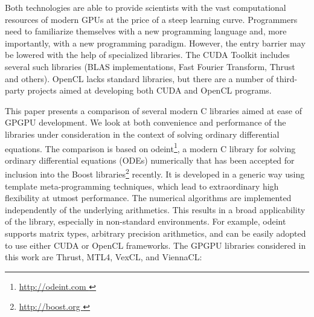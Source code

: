 \documentclass[final]{siamltex}
\newcommand{\addpp}[1]{{#1\nolinebreak[4]\hspace{-.05em}\raisebox{.4ex}{\tiny\bf ++}}\xspace}
\newcommand{\Cpp}{\addpp{C}}
\begin{document}
Both technologies are able to provide scientists with the vast computational
resources of modern GPUs at the price of a steep learning curve.  Programmers
need to familiarize themselves with a new programming language and, more
importantly, with a new programming paradigm. However, the entry barrier may be
lowered with the help of specialized libraries. The CUDA Toolkit includes
several such libraries (BLAS implementations, Fast Fourier Transform, Thrust
and others). OpenCL lacks standard libraries, but there are a number of
third-party projects aimed at developing both CUDA and OpenCL programs.

This paper presents a comparison of several modern \Cpp libraries aimed at ease
of GPGPU development. We look at both convenience and performance of the
libraries under consideration in the context of solving ordinary differential
equations.  The comparison is based on odeint\footnote{ \href{
http://odeint.com }{ http://odeint.com } }, a modern \Cpp library for solving
ordinary differential equations (ODEs) numerically  \cite{OdeintRef2,OdeintRef1}
that has been accepted for inclusion into the Boost
libraries\footnote{ \href{ http://boost.org } { http://boost.org } } recently.
It is developed in a generic way using template meta-programming techniques,
which lead to extraordinary high flexibility at utmost performance. The
numerical algorithms are implemented independently of the underlying
arithmetics. This results in a broad applicability of the library, especially
in non-standard environments.  For example, odeint supports matrix types,
arbitrary precision arithmetics, and can be easily adopted to use either CUDA
or OpenCL frameworks.  The GPGPU libraries considered in this work are Thrust,
MTL4, VexCL, and ViennaCL:
\end{document}
